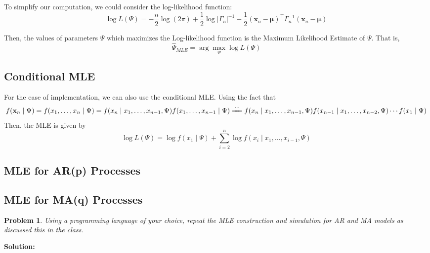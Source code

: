 \documentclass[11pt]{article}
\theoremstyle{plain} %
\newtheorem{problem}[theorem]{Problem}
\newenvironment{solution}
{\color{C2}\normalfont\begin{framed}\begingroup\textbf{Solution:} }
  {\endgroup\end{framed}}
\theoremstyle{remark}
\begin{document}
To simplify our computation, we could consider the log-likelihood function:
$$
\log L(\Psi)= -\frac{n}{2} \log (2 \pi)+\frac{1}{2} \log \left|\Gamma_n\right|^{-1}-\frac{1}{2}(\mathbf{x}_n-\boldsymbol{\mu})^\top \Gamma_n^{-1}(\mathbf{x}_n-\boldsymbol{\mu})
$$

Then, the values of parameters $\Psi$ which maximizes the Log-likelihood function is the Maximum Likelihood Estimate of $\Psi$. That is, 
$$
\hat{\Psi}_{MLE}=\arg \max_{\Psi} \log L(\Psi)
$$
\subsection*{Conditional MLE}
For the ease of implementation, we can also use the conditional MLE. Using the fact that 
$$
f(\mathbf{x}_n \mid \Psi) = f(x_1, \ldots, x_n \mid \Psi) 
= f(x_n \mid x_1, \ldots, x_{n-1}, \Psi) f(x_1, \ldots, x_{n-1} \mid \Psi) 
\xlongequal{\cdots} f(x_n \mid x_1, \ldots, x_{n-1}, \Psi)f(x_{n-1} \mid x_1, \ldots, x_{n-2}, \Psi) \cdots f(x_1 \mid \Psi)
$$
Then, the MLE is given by
$$
\log L(\Psi) = \log f(x_1 \mid \Psi) + \sum_{i=2}^{n} \log f(x_{i} \mid x_1, \ldots, x_{i-1}, \Psi)
$$

\subsection*{MLE for AR(p) Processes}



\subsection*{MLE for MA(q) Processes}



\begin{problem}
Using a programming language of your choice, repeat the MLE construction and simulation for AR and MA models as discussed this in the class.
\end{problem}

\begin{solution}

\end{solution}
\end{document}
